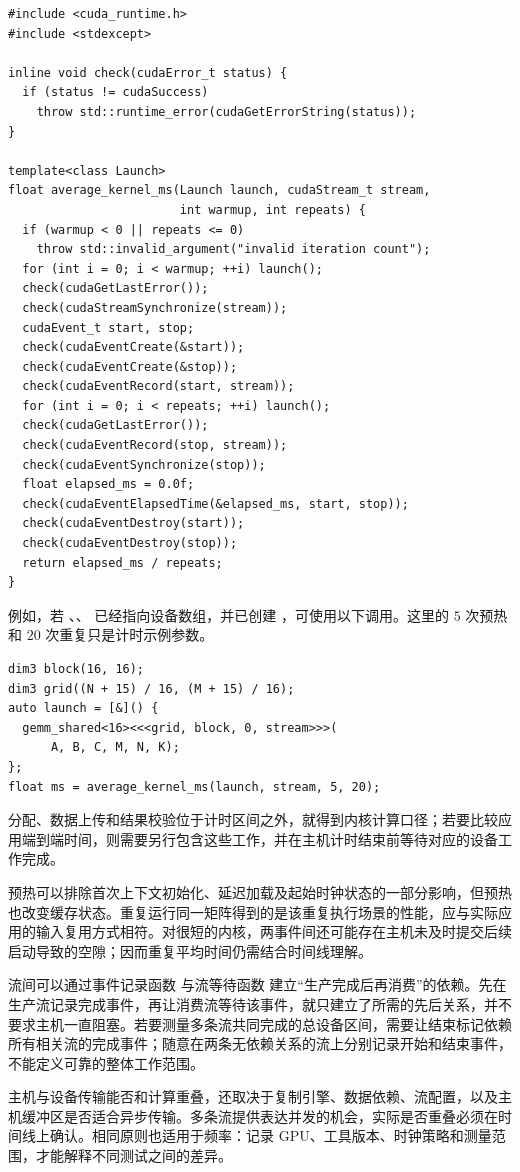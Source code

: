 \noindent\begin{minipage}{\linewidth}
\begin{lstlisting}[caption={带预热与重复执行的 CUDA 事件计时},label={l14:lst:timer}]
#include <cuda_runtime.h>
#include <stdexcept>

inline void check(cudaError_t status) {
  if (status != cudaSuccess)
    throw std::runtime_error(cudaGetErrorString(status));
}

template<class Launch>
float average_kernel_ms(Launch launch, cudaStream_t stream,
                        int warmup, int repeats) {
  if (warmup < 0 || repeats <= 0)
    throw std::invalid_argument("invalid iteration count");
  for (int i = 0; i < warmup; ++i) launch();
  check(cudaGetLastError());
  check(cudaStreamSynchronize(stream));
  cudaEvent_t start, stop;
  check(cudaEventCreate(&start));
  check(cudaEventCreate(&stop));
  check(cudaEventRecord(start, stream));
  for (int i = 0; i < repeats; ++i) launch();
  check(cudaGetLastError());
  check(cudaEventRecord(stop, stream));
  check(cudaEventSynchronize(stop));
  float elapsed_ms = 0.0f;
  check(cudaEventElapsedTime(&elapsed_ms, start, stop));
  check(cudaEventDestroy(start));
  check(cudaEventDestroy(stop));
  return elapsed_ms / repeats;
}
\end{lstlisting}
\end{minipage}

例如，若 、、 已经指向设备数组，并已创建 ，可使用以下调用。这里的 $5$ 次预热和 $20$ 次重复只是计时示例参数。

\noindent\begin{minipage}{\linewidth}
\begin{lstlisting}[caption={将计时对象显式绑定到同一条流}]
dim3 block(16, 16);
dim3 grid((N + 15) / 16, (M + 15) / 16);
auto launch = [&]() {
  gemm_shared<16><<<grid, block, 0, stream>>>(
      A, B, C, M, N, K);
};
float ms = average_kernel_ms(launch, stream, 5, 20);
\end{lstlisting}
\end{minipage}

分配、数据上传和结果校验位于计时区间之外，就得到内核计算口径；若要比较应用端到端时间，则需要另行包含这些工作，并在主机计时结束前等待对应的设备工作完成。

预热可以排除首次上下文初始化、延迟加载及起始时钟状态的一部分影响，但预热也改变缓存状态。重复运行同一矩阵得到的是该重复执行场景的性能，应与实际应用的输入复用方式相符。对很短的内核，两事件间还可能存在主机未及时提交后续启动导致的空隙；因而重复平均时间仍需结合时间线理解。

流间可以通过事件记录函数  与流等待函数  建立“生产完成后再消费”的依赖。先在生产流记录完成事件，再让消费流等待该事件，就只建立了所需的先后关系，并不要求主机一直阻塞。若要测量多条流共同完成的总设备区间，需要让结束标记依赖所有相关流的完成事件；随意在两条无依赖关系的流上分别记录开始和结束事件，不能定义可靠的整体工作范围。

主机与设备传输能否和计算重叠，还取决于复制引擎、数据依赖、流配置，以及主机缓冲区是否适合异步传输。多条流提供表达并发的机会，实际是否重叠必须在时间线上确认。相同原则也适用于频率：记录 GPU、工具版本、时钟策略和测量范围，才能解释不同测试之间的差异。
